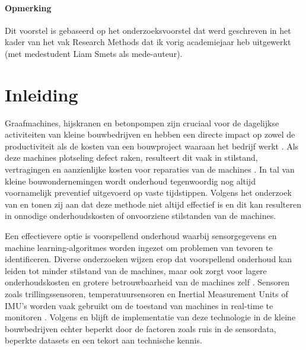 

\paragraph{Opmerking}

Dit voorstel is gebaseerd op het onderzoeksvoorstel dat werd geschreven in het
kader van het vak Research Methods dat ik vorig academiejaar heb
uitgewerkt (met medestudent Liam Smets als mede-auteur).


\section{Inleiding}%
\label{sec:inleiding}

Graafmachines, hijskranen en betonpompen zijn cruciaal voor de dagelijkse activiteiten van kleine bouwbedrijven en hebben een directe impact op zowel de productiviteit als de kosten van een bouwproject waaraan het bedrijf werkt \autocite{Mikulic2024}. Als deze machines plotseling defect raken, resulteert dit vaak in stilstand, vertragingen en aanzienlijke kosten voor reparaties van de machines \autocite{ErRatby2025}. In tal van kleine bouwondernemingen wordt onderhoud tegenwoordig nog altijd voornamelijk preventief uitgevoerd op vaste tijdstippen. Volgens het onderzoek van \textcite{Morganti2024} en \textcite{Deepak2025} tonen zij aan dat deze methode niet altijd effectief is en dit kan resulteren in onnodige onderhoudskosten of onvoorziene stilstanden van de machines.

Een effectievere optie is voorspellend onderhoud waarbij sensorgegevens en machine learnin\-g-algoritmes worden ingezet om problemen van tevoren te identificeren. Diverse onderzoeken wijzen erop dat voorspellend onderhoud kan leiden tot minder stilstand van de machines, maar ook zorgt voor lagere onderhoudskosten en grotere betrouwbaarheid van de machines zelf \autocite{Carvalho2019, ErRatby2025, Mahale2025}. Sensoren zoals trillingssensoren, temperatuursensoren en Inertial Measurement Units of IMU's worden vaak gebruikt om de toestand van machines in real-time te monitoren \autocite{Nayak2024, Molaei2024}. Volgens \textcite{Elahi2023} en \textcite{Wang2025} blijft de implementatie van deze technologie in de kleine bouwbedrijven echter beperkt door de factoren zoals ruis in de sensordata, beperkte datasets en een tekort aan technische kennis.

